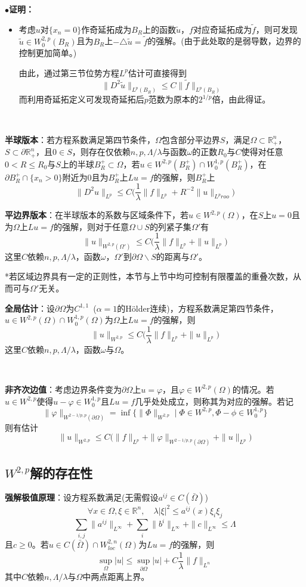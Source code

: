\documentclass[a4paper,UTF8,fontset=windows,AutoFakeBold]{ctexart}
\newcommand{\proo}[1]{{\kaishu $\bullet$\textbf{证明：}
\begin{itemize}
    \item[] #1
\end{itemize}
}}
\begin{document}
\proo{
    考虑$u$对$\{x_n=0\}$作奇延拓成为$B_R$上的函数$\tilde{u}$，$f$对应奇延拓成为$\tilde{f}$，则可发现$\tilde{u}\in W_0^{2,p}(B_R)$且为$B_R$上$-\triangle\tilde{u}=\tilde{f}$的强解。(由于此处取的是弱导数，边界的控制更加简单。)

    由此，通过第三节位势方程$L^p$估计可直接得到
    $$\|D^2\tilde{u}\|_{L^p(B_R)}\le C\|\tilde{f}\|_{L^p(B_R)}$$
    而利用奇延拓定义可发现奇延拓后$p$范数为原本的$2^{1/p}$倍，由此得证。

}

\

\textbf{半球版本}：若方程系数满足第四节条件，$\Omega$包含部分平边界$S$，满足$\Omega\subset\mathbb{R}^n_+$，$S\subset\partial\mathbb{R}^n_+$，且$0\in S$，则存在仅依赖$n,p,\Lambda/\lambda$与函数$\omega$的正数$R_0$与$C$使得对任意$0<R\le R_0$与$S$上的半球$B_R^+\subset\Omega$，若$u\in W^{2,p}(B_R^+)\cap W^{1,p}_0(B_R^+)$，在$\partial B_R^+\cap\{x_n>0\}$附近为0且为$B_R^+$上$Lu=f$的强解，则$B_R^+$上
$$\|D^2u\|_{L^p}\le C\bigg(\frac{1}{\lambda}\|f\|_{L^p}+R^{-2}\|u\|_{L^proo}\bigg)$$

\textbf{平边界版本}：在半球版本的系数与区域条件下，若$u\in W^{2,p}(\Omega)$，在$S$上$u=0$且为$\Omega$上$Lu=f$的强解，则对于任意$\Omega\cup S$的列紧子集$\Omega'$有
$$\|u\|_{W^{2,p}(\Omega')}\le C\bigg(\frac{1}{\lambda}\|f\|_{L^p}+\|u\|_{L^p}\bigg)$$
这里$C$依赖$n,p,\Lambda/\lambda$，函数$\omega$，$\Omega'$到$\partial\Omega\backslash S$的距离与$\Omega'$。

*若区域边界具有一定的正则性，本节与上节中均可控制有限覆盖的重叠次数，从而可与$\Omega'$无关。

\textbf{全局估计}：设$\partial\Omega$为$C^{1,1}$\ ($\alpha=1$的H\"older连续)，方程系数满足第四节条件，$u\in W^{2,p}(\Omega)\cap W^{1,p}_0(\Omega)$为$\Omega$上$Lu=f$的强解，则
$$\|u\|_{W^{2,p}}\le C\bigg(\frac{1}{\lambda}\|f\|_{L^p}+\|u\|_{L^p}\bigg)$$
这里$C$依赖$n,p,\Lambda/\lambda$，函数$\omega$与$\Omega$。

\

\textbf{非齐次边值}：考虑边界条件变为$\partial\Omega$上$u=\varphi$，且$\varphi\in W^{2,p}(\Omega)$的情况。若$u\in W^{2,p}$使得$u-\varphi\in W_0^{1,p}$且$Lu=f$几乎处处成立，则称其为对应的强解。若记
$$\|\varphi\|_{W^{2-1/p,p}(\partial\Omega)}=\inf\big\{\|\Phi\|_{W^{2,p}}\mid\Phi\in W^{2,p},\Phi-\phi\in W_0^{1,p}\big\}$$
则有估计
$$\|u\|_{W^{2,p}}\le C\big(\|f\|_{L^p}+\|\varphi\|_{W^{2-1/p,p}(\partial\Omega)}+\|u\|_{L^p}\big)$$

\subsection{$W^{2,p}$解的存在性}
\textbf{强解极值原理}：设方程系数满足(无需假设$a^{ij}\in C(\bar\Omega)$)
$$\forall x\in\Omega,\xi\in\mathbb{R}^n,\quad\lambda|\xi|^2\le a^{ij}(x)\xi_i\xi_j$$
$$\sum_{i,j}\|a^{ij}\|_{L^\infty}+\sum_i\|b^i\|_{L^\infty}+\|c\|_{L^\infty}\le\Lambda$$
且$c\ge0$。若$u\in C(\bar{\Omega})\cap W_{loc}^{2,n}(\Omega)$为$Lu=f$的强解，则
$$\sup_\Omega|u|\le\sup_{\partial\Omega}|u|+C\frac{1}{\lambda}\|f\|_{L^n}$$
其中$C$依赖$n,\Lambda/\lambda$与$\Omega$中两点距离上界。
\end{document}

